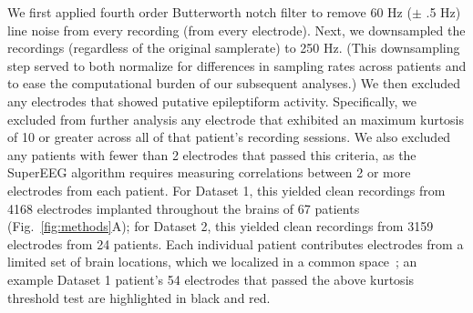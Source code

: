 \documentclass[11pt]{article}
\begin{document}
We first applied fourth order Butterworth notch filter to remove 60 Hz
($\pm$ .5 Hz) line noise from every recording (from every electrode).
Next, we downsampled the recordings (regardless of the original
samplerate) to 250 Hz.  (This downsampling step served to both
normalize for differences in sampling rates across patients and to
ease the computational burden of our subsequent analyses.)  We then
excluded any electrodes that showed putative epileptiform activity.
Specifically, we excluded from further analysis any electrode that
exhibited an maximum kurtosis of 10 or greater across all of that
patient's recording sessions.  We also excluded any patients with
fewer than 2 electrodes that passed this criteria, as the SuperEEG
algorithm requires measuring correlations between 2 or more electrodes
from each patient.  For Dataset 1, this yielded clean recordings from
4168 electrodes implanted throughout the brains of 67 patients
(Fig.~\ref{fig:methods}A); for Dataset 2, this yielded clean
recordings from 3159 electrodes from 24 patients.  Each individual
patient contributes electrodes from a limited set of brain locations,
which we localized in a common space~\citep[MNI152;][]{GrabEtal06}; an
example Dataset 1 patient's 54 electrodes that passed the above
kurtosis threshold test are highlighted in black and red.
\end{document}
